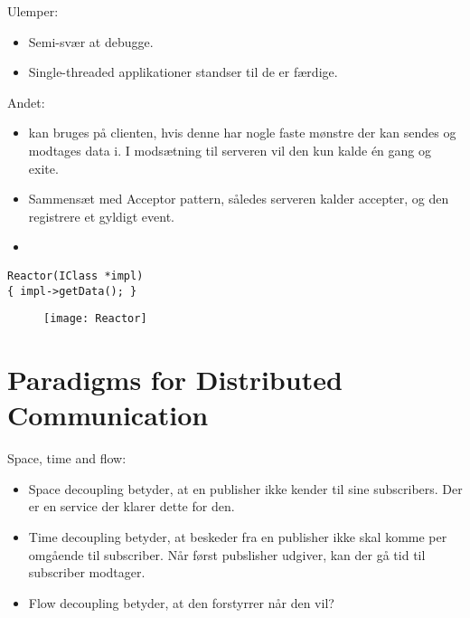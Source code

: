 \documentclass{article}
\begin{document}
Ulemper:
\begin{itemize}
	\item Semi-svær at debugge.
	\item Single-threaded applikationer standser  til de er færdige.
\end{itemize}

Andet:
\begin{itemize}
	\item {} kan bruges på clienten, hvis denne har nogle faste mønstre der kan sendes og modtages data i.
	I modsætning til serveren vil den kun kalde  én gang og exite.
	\item Sammensæt med Acceptor pattern, således serveren kalder accepter, og den registrere et gyldigt event.
	\item {}
\end{itemize}

\begin{lstlisting}[caption=Bridge / interface injection, style=Code-C++, label=lst:DI]
Reactor(IClass *impl)
{ impl->getData(); }
\end{lstlisting}

\begin{figure}[hbtp]
\centering
\texttt{[image: Reactor]}
\end{figure}





\newpage
\section{Paradigms for Distributed Communication}

Space, time and flow:
\begin{itemize}
	\item Space decoupling betyder, at en publisher ikke kender til sine subscribers.
	Der er en service der klarer dette for den.

	\item Time decoupling betyder, at beskeder fra en publisher ikke skal komme per omgående til subscriber.
	Når først pubslisher udgiver, kan der gå tid til subscriber modtager.

	\item Flow decoupling betyder, at den forstyrrer når den vil?
\end{itemize}
\end{document}
